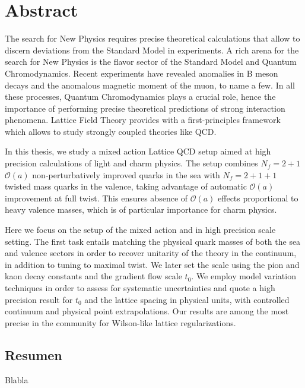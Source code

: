 \begingroup
\let\clearpage\relax
\let\cleardoublepage\relax
\let\cleardoublepage\relax

\chapter*{Abstract}
The search for New Physics requires precise theoretical calculations that allow to discern deviations from the Standard Model in experiments. A rich arena for the search for New Physics is the flavor sector of the Standard Model and Quantum Chromodynamics. Recent experiments have revealed anomalies in B meson decays and the anomalous magnetic moment of the muon, to name a few. In all these processes, Quantum Chromodynamics plays a crucial role, hence the importance of performing precise theoretical predictions of strong interaction phenomena. Lattice Field Theory provides with a first-principles framework which allows to study strongly coupled theories like QCD.

In this thesis, we study a mixed action Lattice QCD setup aimed at high precision calculations of light and charm physics. The setup combines $N_f=2+1$ $\mathcal{O}(a)$ non-perturbatively improved quarks in the sea with $N_f=2+1+1$ twisted mass quarks in the valence, taking advantage of automatic $\mathcal{O}(a)$ improvement at full twist. This ensures absence of $\mathcal{O}(a)$ effects proportional to heavy valence masses, which is of particular importance for charm physics. 

Here we focus on the setup of the mixed action and in high precision scale setting. The first task entails matching the physical quark masses of both the sea and valence sectors in order to recover unitarity of the theory in the continuum, in addition to tuning to maximal twist. We later set the scale using the pion and kaon decay constants and the gradient flow scale $t_0$. We employ model variation techniques in order to assess for systematic uncertainties and quote a high precision result for $t_0$ and the lattice spacing in physical units, with controlled continuum and physical point extrapolations. Our results are among the most precise in the community for Wilson-like lattice regularizations.

\vfill

\begin{otherlanguage}{spanish}
\chapter*{Resumen}
Blabla
\end{otherlanguage}

\endgroup

\vfill
